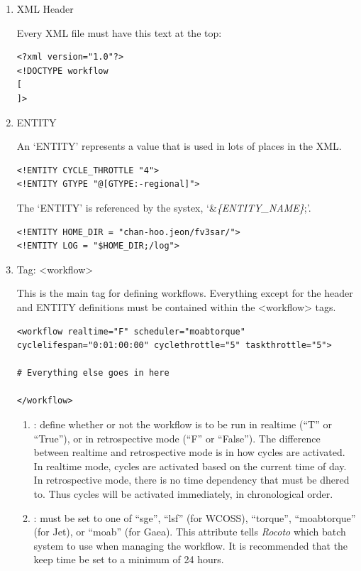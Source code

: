 \documentclass[11pt,fleqn]{report}              %
\begin{document}
\begin{enumerate}
\item XML Header

Every XML file must have this text at the top:
\lstset{language=XML}   
\begin{lstlisting}[frame=trBL]
<?xml version="1.0"?>
<!DOCTYPE workflow
[
]>
\end{lstlisting}


\item ENTITY

An `ENTITY' represents a value that is used in lots of places in the XML.
\lstset{language=XML}   
\begin{lstlisting}[frame=trBL]
<!ENTITY CYCLE_THROTTLE "4">
<!ENTITY GTYPE "@[GTYPE:-regional]">
\end{lstlisting}

The `ENTITY' is referenced by the systex, `\&{\it \{ENTITY\_NAME\}};'.
\lstset{language=XML}   
\begin{lstlisting}[frame=trBL]
<!ENTITY HOME_DIR = "chan-hoo.jeon/fv3sar/">
<!ENTITY LOG = "$HOME_DIR;/log">
\end{lstlisting}


\item Tag: <workflow>

This is the main tag for defining workflows. Everything except for the header and ENTITY definitions must be contained within the <workflow> tags.
\lstset{language=XML}   
\begin{lstlisting}[frame=trBL]
<workflow realtime="F" scheduler="moabtorque" cyclelifespan="0:01:00:00" cyclethrottle="5" taskthrottle="5">

# Everything else goes in here

</workflow>
\end{lstlisting}

\begin{enumerate}
\item {: define whether or not the workflow is to be run in realtime (``T'' or ``True''), or in retrospective mode (``F'' or ``False''). The difference between realtime and retrospective mode is in how cycles are activated. In realtime mode, cycles are activated based on the current time of day. In retrospective mode, there is no time dependency that must be dhered to. Thus cycles will be activated immediately, in chronological order.}

\item {: must be set to one of ``sge'', ``lsf'' (for WCOSS), ``torque'', ``moabtorque'' (for Jet), or ``moab'' (for Gaea). This attribute tells {\it Rocoto} which batch system to use when managing the workflow. It is recommended that the keep time be set to a minimum of 24 hours.}


\end{enumerate}
\end{enumerate}
\end{document}
